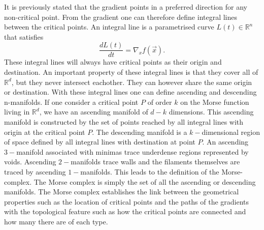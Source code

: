 It is previously stated that the gradient points in a preferred direction for any non-critical
point. From the gradient one can therefore define integral lines between the critical
points. An integral line is a parametrised curve $L(t)\in\mathbb{R}^n$ that satisfies
\begin{equation}
    \frac{dL(t)}{dt}=\nabla_xf(\vec{x}).
\end{equation}
These integral lines will always have critical points as their origin and
destination. An important property of these integral lines is that they cover
all of $\mathbb{R}^d$, but they never intersect eachother. They can however
share the same origin or destination. With these integral lines one can define
ascending and descending n-manifolds. If one consider a critical point $P$ of
order $k$ on the Morse function living in $\mathbb{R}^d$, we have an ascending manifold of
$d-k$ dimensions. This ascending manifold is constructed by the set of points reached by
all integral lines with origin at the critical point $P$. The descending
manifold is a $k-$dimensional region of space defined by all integral lines with
destination at point $P$. An ascending $3-$manifold associated with minimas trace underdense regions represented by voids. Ascending $2-$manifolds trace walls and the filaments themselves are traced by ascending $1-$manifolds. This leads to the definition of the Morse-complex.
The Morse complex is simply the set of all the ascending or descending
manifolds. The Morse complex establishes the link between the geometrical properties such as the location of critical points and the paths of the gradients with the topological feature such as how the critical points are connected and how many there are of each type.\\
